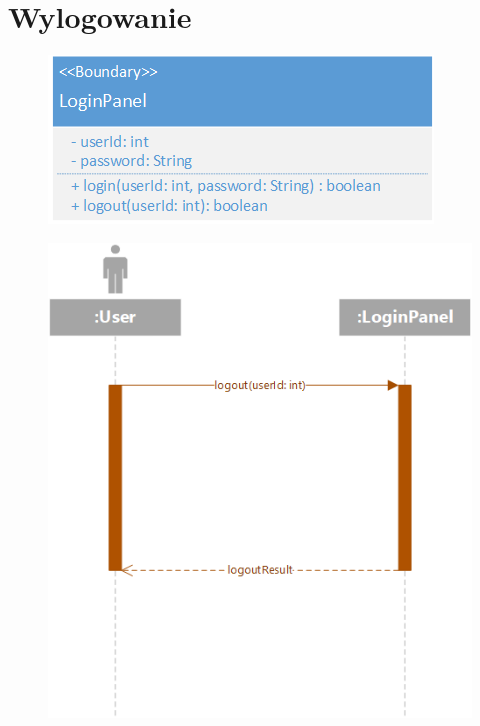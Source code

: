 \documentclass[11pt, a4paper, oneside]{report}
\begin{document}
\section{Wylogowanie}
\begin{figure}[H]
\centering
\includegraphics[scale=0.5]{wylogowanie_class.png}
\end{figure}
\begin{figure}[H]
\centering
\includegraphics[scale=0.5]{wylogowanie_sequence.png}
\end{figure}
\end{document}
